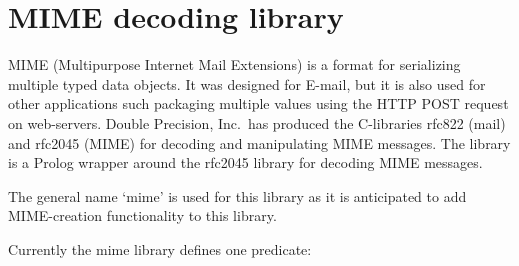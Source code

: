 \documentclass[11pt]{article}
\begin{document}
\section{MIME decoding library}

MIME (Multipurpose Internet Mail Extensions) is a format for serializing
multiple typed data objects.  It was designed for E-mail, but it is also
used for other applications such packaging multiple values using the
HTTP POST request on web-servers.  Double Precision, Inc.\ has produced
the C-libraries rfc822 (mail) and rfc2045 (MIME) for decoding and
manipulating MIME messages. The  library is a Prolog wrapper
around the rfc2045 library for decoding MIME messages.	

The general name `mime' is used for this library as it is anticipated to
add MIME-creation functionality to this library.

Currently the mime library defines one predicate:
\end{document}
